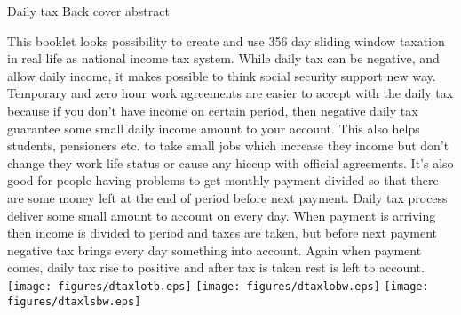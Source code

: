 %
%
%
Daily tax\hspace*{\fill}\linebreak
Back cover abstract\hfill
\label{abstract}
\linebreak

This booklet looks possibility to create and use 356 day sliding window taxation
in real life as national income tax system.
While daily tax can be negative, and allow daily income,
it makes possible to think social security support new way.
Temporary and zero hour work agreements are easier to accept with the daily tax
because if you don't have income on certain period,
then negative daily tax guarantee some small daily income amount to your account.
This also helps students, pensioners etc. to take small jobs which increase they income
but don't change they work life status or cause any hiccup with official agreements.
It's also good for people having problems to get monthly payment divided so
that there are some money left at the end of period before next payment.
Daily tax process deliver some small amount to account on every day.
When payment is arriving then income is divided to period and taxes are taken,
but before next payment negative tax brings every day something into account.
Again when payment comes, daily tax rise to positive and after tax is taken
rest is left to account.\hfill\break
\linebreak\vfill
\texttt{[image: figures/dtaxlotb.eps]} \hfill
\texttt{[image: figures/dtaxlobw.eps]} \hfill
\texttt{[image: figures/dtaxlsbw.eps]}

